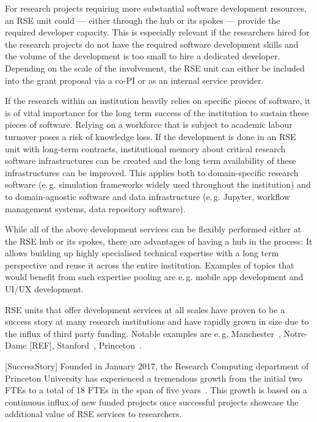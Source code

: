\documentclass[a4paper]{article}
\makeatletter
\newcommand*{\eg}{e.\,g.\@\xspace}
\makeatother
\begin{document}
For research projects requiring more substantial software development resources, an RSE unit could --- either through the hub or its spokes --- provide the required developer capacity.
This is especially relevant if the researchers hired for the research projects do not have the required software development skills and the volume of the development is too small to hire a dedicated developer.
Depending on the scale of the involvement, the RSE unit can either be included into the grant proposal via a co-PI or as an internal service provider.

If the research within an institution heavily relies on specific pieces of software,
it is of vital importance for the long term success of the institution to sustain these pieces of software.
Relying on a workforce that is subject to academic labour turnover poses a risk of knowledge loss.
If the development is done in an RSE unit with long-term contracts, institutional memory about critical research software infrastructures can be created and the long term availability of these infrastructures can be improved.
This applies both to domain-specific research software (\eg{} simulation frameworks widely used throughout the institution)
and to domain-agnostic software and data infrastructure (\eg{} Jupyter, workflow management systems, data repository software).

While all of the above development services can be flexibly performed either at the RSE hub or its spokes, there are advantages of having a hub in the process:
It allows building up highly specialised technical expertise with a long term perspective and reuse it across the entire institution.
Examples of topics that would benefit from such expertise pooling are \eg{} mobile app development and UI/UX development.

RSE units that offer development services at all scales have proven to be a success story at many research institutions and have rapidly grown in size due to the influx of third party funding.
Notable examples are \eg{} Manchester~\autocite{Sinclair2022}, Notre-Dame [REF], Stanford~\autocite{Stanford2023}, Princeton~\autocite{Cosden2022a}.

[SuccessStory]
Founded in January 2017, the Research Computing department of Princeton University has experienced a tremendous growth from the initial two FTEs to a total of 18 FTEs in the span of five years~\autocite{Cosden2022a}.
This growth is based on a continuous influx of new funded projects once successful projects showcase the additional value of RSE services to researchers.
\end{document}
